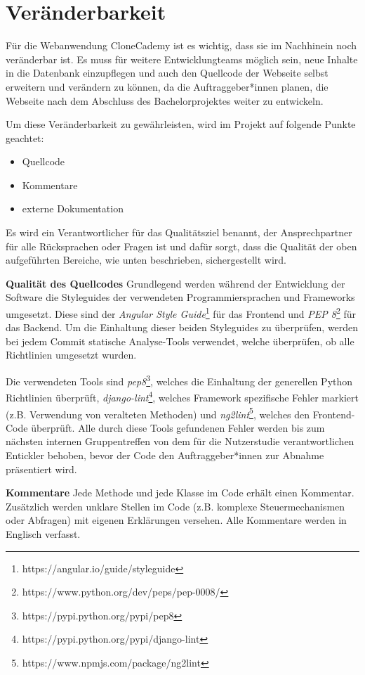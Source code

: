 \section{Veränderbarkeit}
Für die Webanwendung CloneCademy ist es wichtig, dass sie im Nachhinein noch veränderbar ist. Es muss für weitere Entwicklungteams möglich sein, neue Inhalte in die Datenbank einzupflegen und auch den Quellcode der Webseite selbst erweitern und verändern zu können, da die Auftraggeber*innen planen, die Webseite nach dem Abschluss des Bachelorprojektes weiter zu entwickeln.

Um diese Veränderbarkeit zu gewährleisten, wird im Projekt auf folgende Punkte geachtet:
\begin{itemize}
	\item Quellcode
	\item Kommentare
	\item externe Dokumentation
\end{itemize}

Es wird ein Verantwortlicher für das Qualitätsziel benannt, der Ansprechpartner für alle Rücksprachen oder Fragen ist und dafür sorgt, dass die Qualität der oben aufgeführten Bereiche, wie unten beschrieben, sichergestellt wird.

\textbf{Qualität des Quellcodes}
Grundlegend werden während der Entwicklung der Software die Styleguides der verwendeten Programmiersprachen und Frameworks umgesetzt. Diese sind der \emph{Angular Style Guide}\footnote{https://angular.io/guide/styleguide} für das Frontend und \emph{PEP 8}\footnote{https://www.python.org/dev/peps/pep-0008/} für das Backend. Um die Einhaltung dieser beiden Styleguides zu überprüfen, werden bei jedem Commit statische Analyse-Tools verwendet, welche überprüfen, ob alle Richtlinien umgesetzt wurden.

Die verwendeten Tools sind \emph{pep8}\footnote{https://pypi.python.org/pypi/pep8}, welches die Einhaltung der generellen Python Richtlinien überprüft, \emph{django-lint}\footnote{https://pypi.python.org/pypi/django-lint}, welches Framework spezifische Fehler markiert (z.B. Verwendung von veralteten Methoden) und \emph{ng2lint}\footnote{https://www.npmjs.com/package/ng2lint}, welches den Frontend-Code überprüft. Alle durch diese Tools gefundenen Fehler werden bis zum nächsten internen Gruppentreffen von dem für die Nutzerstudie verantwortlichen Entickler behoben, bevor der Code den Auftraggeber*innen zur Abnahme präsentiert wird.


\textbf{Kommentare}
Jede Methode und jede Klasse im Code erhält einen Kommentar. Zusätzlich werden unklare Stellen im Code (z.B. komplexe Steuermechanismen oder Abfragen) mit eigenen Erklärungen versehen. Alle Kommentare werden in Englisch verfasst.

